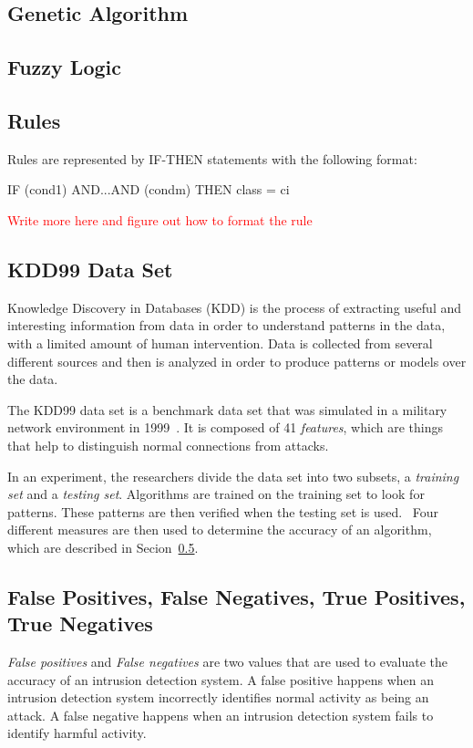 \documentclass{sig-alternate}
\newcommand{\mycomment}[1]{\textcolor{red}{#1}}
\begin{document}
\subsection{Genetic Algorithm}

\subsection{Fuzzy Logic}


\subsection{Rules}
Rules are represented by IF-THEN statements with the following format:

IF (cond1) AND...AND (condm) THEN class = ci

\mycomment{Write more here and figure out how to format the rule}




\subsection{KDD99 Data Set}
Knowledge Discovery in Databases (KDD) is the process of extracting useful and interesting information from data in order to understand patterns in the data, with a limited amount of human intervention. Data is collected from several different sources and then is analyzed in order to produce patterns or models over the data.~\cite{bc1_ecindm}

The KDD99 data set is a benchmark data set that was simulated in a military network environment in 1999~\cite{6559603}. It is composed of 41 \emph{features}, which are things that help to distinguish normal connections from attacks.

In an experiment, the researchers divide the data set into two subsets, a \emph{training set} and a \emph{testing set}. Algorithms are trained on the training set to look for patterns. These patterns are then verified when the testing set is used.~\cite{bc1_ecindm} Four different measures are then used to determine the accuracy of an algorithm, which are described in Secion~\ref{sec:PosNeg}.




\subsection{False Positives, False Negatives, True Positives, True Negatives}
\label{sec:PosNeg}
\emph{False positives} and \emph{False negatives} are two values that are used to evaluate the accuracy of an intrusion detection system. A false positive happens when an intrusion detection system incorrectly identifies normal activity as being an attack. A false negative happens when an intrusion detection system fails to identify harmful activity.~\cite{Liao201316}
\end{document}
